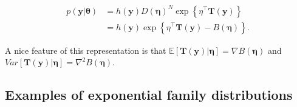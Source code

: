 \begin{align}
	p(\mathbf{y}|\bm{\theta})&=h(\mathbf{y})D(\bm{\eta})^N\exp\left\{\eta^{\top}\mathbf{T}(\mathbf{y})\right\}\nonumber\\
	&=h(\mathbf{y})\exp\left\{\eta^{\top}\mathbf{T}(\mathbf{y})-B(\bm{\eta})\right\}.\nonumber
\end{align}

A nice feature of this representation is that $\mathbb{E}[\mathbf{T}(\mathbf{y})|\bm{\eta}]=\nabla B(\bm{\eta})$ and $Var[\mathbf{T}(\mathbf{y})|\bm{\eta}]=\nabla^2 B(\bm{\eta})$. 

\subsection{Examples of exponential family distributions}

